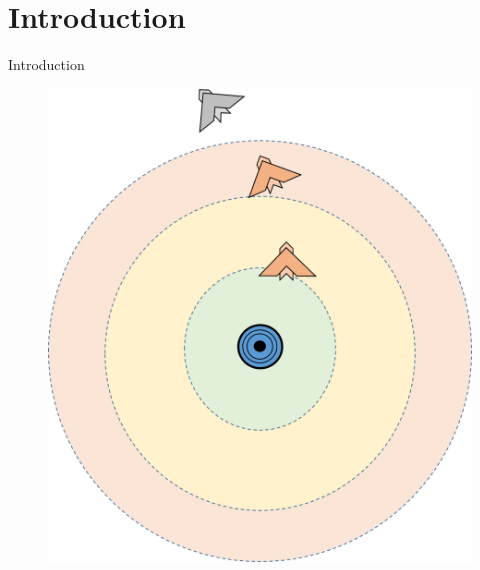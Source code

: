 \section{Introduction}

\begin{frame}{Introduction}{}
\begin{figure}[H]
\centerline{
\includegraphics[scale=0.35]{figures/intro.png}}
\label{fig:overview}
\end{figure}
\end{frame}

